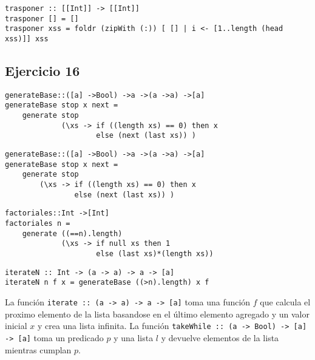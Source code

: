 \begin{centrado}
    \begin{verbatim}
trasponer :: [[Int]] -> [[Int]]
trasponer [] = []
trasponer xss = foldr (zipWith (:)) [ [] | i <- [1..length (head xss)]] xss
    \end{verbatim}
\end{centrado}

\subsection{Ejercicio 16}
\begin{centrado}
    \begin{verbatim}
generateBase::([a] ->Bool) ->a ->(a ->a) ->[a]
generateBase stop x next = 
    generate stop 
             (\xs -> if ((length xs) == 0) then x 
                     else (next (last xs)) ) 
    \end{verbatim}
\end{centrado}

\begin{centrado}
    \begin{verbatim}
generateBase::([a] ->Bool) ->a ->(a ->a) ->[a]
generateBase stop x next = 
    generate stop 
        (\xs -> if ((length xs) == 0) then x 
                else (next (last xs)) ) 
    \end{verbatim}
\end{centrado}

\begin{centrado}
    \begin{verbatim}
factoriales::Int ->[Int]
factoriales n = 
    generate ((==n).length)
             (\xs -> if null xs then 1
                     else (last xs)*(length xs))
    \end{verbatim}
\end{centrado}

\begin{centrado}
    \begin{verbatim}
iterateN :: Int -> (a -> a) -> a -> [a]
iterateN n f x = generateBase ((>n).length) x f
    \end{verbatim}
\end{centrado}

La función \texttt{iterate :: (a -> a) -> a -> [a]} toma una función $f$ que calcula el proximo elemento de la lista basandose en el último elemento agregado y un valor inicial $x$ y crea una lista infinita. La función \texttt{takeWhile :: (a -> Bool) -> [a] -> [a]} toma un predicado $p$ y una lista $l$ y devuelve elementos de la lista mientras cumplan $p$.

